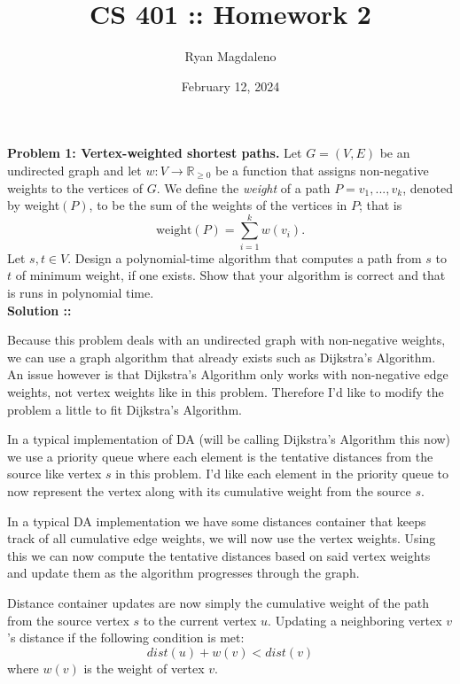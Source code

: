 \documentclass[11pt]{article}
\date{February 12, 2024}
\title{CS 401 :\hspace{2px}: Homework 2}
\author{Ryan Magdaleno}
\begin{document}
\maketitle


\textbf{Problem 1: Vertex-weighted shortest paths.} 
Let $G = (V, E)$ be an undirected graph and let $w : V\rightarrow\mathbb{R}_{\ge 0}$
be a function that assigns non-negative weights to the vertices of $G$. We define
the \textit{weight} of a path $P=v_1,...,v_k$, denoted by weight$(P)$, to be the
sum of the weights of the vertices in $P$; that is
$$\text{weight}(P)=\sum_{i=1}^k w(v_i).$$
Let $s,t\in V.$ Design a polynomial-time algorithm that computes a path from $s$
to $t$ of minimum weight, if one exists. Show that your algorithm is correct and
that is runs in polynomial time. \\
\vspace{5px}\textbf{Solution ::}

Because this problem deals with an undirected graph with non-negative weights, we can
use a graph algorithm that already exists such as Dijkstra's Algorithm. An issue
however is that Dijkstra's Algorithm only works with non-negative edge weights, not
vertex weights like in this problem. Therefore I'd like to modify the problem a little
to fit Dijkstra's Algorithm. 

\vspace{5px}In a typical implementation of DA (will be calling 
Dijkstra's Algorithm this now) we use a priority queue where each element is the
tentative distances from the source like vertex $s$ in this problem. I'd like each
element in the priority queue to now represent the vertex along with its cumulative
weight from the source $s$.

\vspace{5px}In a typical DA implementation we have some distances container that
keeps track of all cumulative edge weights, we will now use the vertex weights.
Using this we can now compute the tentative distances based on said vertex weights
and update them as the algorithm progresses through the graph.

\pagebreak
Distance container updates are now simply the cumulative weight of the path from
the source vertex $s$ to the current vertex $u$. Updating a neighboring vertex
$v$'s distance if the following condition is met:
$$dist(u) + w(v) < dist(v)$$
where $w(v)$ is the weight of vertex $v$.
\end{document}
